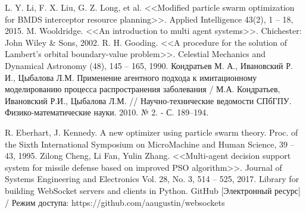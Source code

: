 \begin{thebibliography}{}
	 L. Y. Li, F. X. Liu, G. Z. Long, et al. <<Modified particle swarm
	optimization for BMDS interceptor resource planning>>. Applied
	Intelligence  43(2), 1 – 18, 2015.
	 M. Wooldridge. <<An introduction to multi agent systems>>. Chichester: John Wiley \& Sons, 2002.
	 R. H. Gooding. <<A procedure for the solution of Lambert’s orbital boundary-value problem>>. Celestial Mechanics and Dynamical Astronomy  (48), 145 – 165, 1990.
	  Кондратьев М. А.,	Ивановский Р. И.,	Цыбалова Л.М. Применение агентного подхода к имитационному моделированию процесса распространения заболевания / М.А. Кондратьев, Ивановский Р.И., Цыбалова Л.М. // Научно-технические ведомости СПбГПУ. Физико-математические науки. 2010. № 2. - С. 189–194.
	
	 R. Eberhart, J. Kennedy. A new optimizer using particle swarm	theory. Proc. of the Sixth International Symposium on MicroMachine and Human Science,  39 – 43, 1995.
	 Zilong Cheng, Li Fan, Yulin Zhang. <<Multi-agent decision support system for missile defense based on improved PSO algorithm>>.   Journal of Systems Engineering and Electronics Vol. 28, No. 3,  514 – 525, 2017.
	 Library for building WebSocket servers and clients in Python. GitHub [Электронный ресурс] / Режим доступа: https://github.com/aaugustin/websockets
	
	
\end{thebibliography}